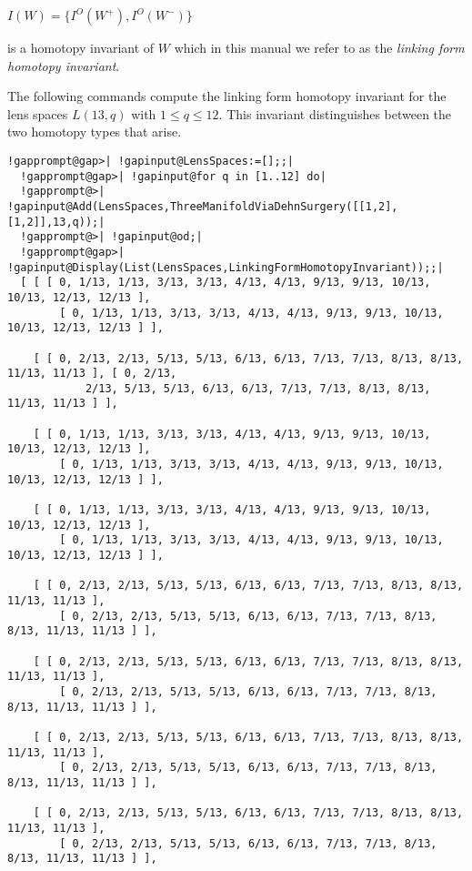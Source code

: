\documentclass[a4paper,11pt]{report}
\begin{document}
{{ $I(W) =\{I^O(W^+), I^O(W^-)\}$ 

is a homotopy invariant of $W$ which in this manual we refer to as the \emph{linking form homotopy invariant}. 

 The following commands compute the linking form homotopy invariant for the
lens spaces $L(13,q)$ with $1\le q\le 12$. This invariant distinguishes between the two homotopy types that arise. 
\begin{Verbatim}[commandchars=!@|,fontsize=\small,frame=single,label=Example]
  !gapprompt@gap>| !gapinput@LensSpaces:=[];;|
  !gapprompt@gap>| !gapinput@for q in [1..12] do|
  !gapprompt@>| !gapinput@Add(LensSpaces,ThreeManifoldViaDehnSurgery([[1,2],[1,2]],13,q));|
  !gapprompt@>| !gapinput@od;|
  !gapprompt@gap>| !gapinput@Display(List(LensSpaces,LinkingFormHomotopyInvariant));;|
  [ [ [ 0, 1/13, 1/13, 3/13, 3/13, 4/13, 4/13, 9/13, 9/13, 10/13, 10/13, 12/13, 12/13 ], 
        [ 0, 1/13, 1/13, 3/13, 3/13, 4/13, 4/13, 9/13, 9/13, 10/13, 10/13, 12/13, 12/13 ] ], 
  
    [ [ 0, 2/13, 2/13, 5/13, 5/13, 6/13, 6/13, 7/13, 7/13, 8/13, 8/13, 11/13, 11/13 ], [ 0, 2/13, 
            2/13, 5/13, 5/13, 6/13, 6/13, 7/13, 7/13, 8/13, 8/13, 11/13, 11/13 ] ], 
  
    [ [ 0, 1/13, 1/13, 3/13, 3/13, 4/13, 4/13, 9/13, 9/13, 10/13, 10/13, 12/13, 12/13 ], 
        [ 0, 1/13, 1/13, 3/13, 3/13, 4/13, 4/13, 9/13, 9/13, 10/13, 10/13, 12/13, 12/13 ] ], 
  
    [ [ 0, 1/13, 1/13, 3/13, 3/13, 4/13, 4/13, 9/13, 9/13, 10/13, 10/13, 12/13, 12/13 ], 
        [ 0, 1/13, 1/13, 3/13, 3/13, 4/13, 4/13, 9/13, 9/13, 10/13, 10/13, 12/13, 12/13 ] ], 
  
    [ [ 0, 2/13, 2/13, 5/13, 5/13, 6/13, 6/13, 7/13, 7/13, 8/13, 8/13, 11/13, 11/13 ], 
        [ 0, 2/13, 2/13, 5/13, 5/13, 6/13, 6/13, 7/13, 7/13, 8/13, 8/13, 11/13, 11/13 ] ], 
  
    [ [ 0, 2/13, 2/13, 5/13, 5/13, 6/13, 6/13, 7/13, 7/13, 8/13, 8/13, 11/13, 11/13 ], 
        [ 0, 2/13, 2/13, 5/13, 5/13, 6/13, 6/13, 7/13, 7/13, 8/13, 8/13, 11/13, 11/13 ] ], 
  
    [ [ 0, 2/13, 2/13, 5/13, 5/13, 6/13, 6/13, 7/13, 7/13, 8/13, 8/13, 11/13, 11/13 ], 
        [ 0, 2/13, 2/13, 5/13, 5/13, 6/13, 6/13, 7/13, 7/13, 8/13, 8/13, 11/13, 11/13 ] ], 
  
    [ [ 0, 2/13, 2/13, 5/13, 5/13, 6/13, 6/13, 7/13, 7/13, 8/13, 8/13, 11/13, 11/13 ], 
        [ 0, 2/13, 2/13, 5/13, 5/13, 6/13, 6/13, 7/13, 7/13, 8/13, 8/13, 11/13, 11/13 ] ], 
  

\end{Verbatim}}}
\end{document}
